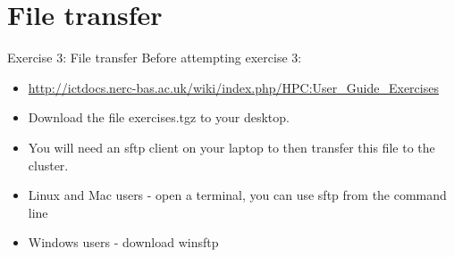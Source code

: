 \documentclass[handout]{beamer} %
\begin{document}
{
\section{File transfer}
%
\begin{frame}{Exercise 3: File transfer}
Before attempting exercise 3:
\begin{itemize}
\item{\url{http://ictdocs.nerc-bas.ac.uk/wiki/index.php/HPC:User_Guide_Exercises}}
\item{Download the file \alert{exercises.tgz} to your desktop.}
\item{You will need an sftp client on your laptop to then transfer this file to the cluster.}
\item{Linux and Mac users - open a terminal, you can use sftp from the command line}
\item{Windows users - download winsftp}
\end{itemize}
\end{frame}
}
\end{document}
